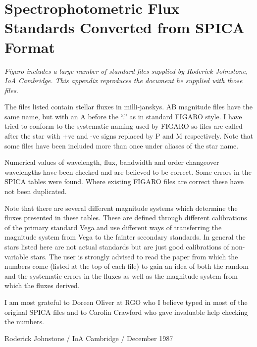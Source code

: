 \section{Spectrophotometric Flux Standards Converted from SPICA Format}

{\it Figaro includes a large number of standard files supplied by
Roderick Johnstone, IoA Cambridge.  This appendix reproduces the document
he supplied with those files.}

The files listed contain stellar fluxes in milli-janskys.
AB magnitude files have the same name, but with an A before the ``.'' as in
standard FIGARO style. I have tried to conform to the systematic naming used
by FIGARO so files are called after the star with +ve and -ve signs replaced
by P and M respectively. Note that some files have been included more than
once under aliases of the star name.

Numerical values of wavelength, flux, bandwidth and order changeover
wavelengths have been checked and are believed to be correct. Some errors
in the SPICA tables were found. Where existing FIGARO files are correct these
have not been duplicated. 

Note that there are several different magnitude systems which determine 
the fluxes presented in these tables. These are defined through different
calibrations of the primary  standard Vega and use different ways of
transferring the magnitude system from Vega to the fainter secondary
standards. In general the stars listed here are not actual standards but are
just good calibrations of non-variable stars. The user is strongly advised to
read the paper from which the numbers come (listed at the top of each file) to
gain an idea of both the random and the systematic errors in the fluxes as
well as the magnitude system from which the fluxes derived. 

I am most grateful to Doreen Oliver at RGO who I believe typed in most of the
original SPICA files and to Carolin Crawford who gave invaluable help checking
the numbers.

Roderick Johnstone / IoA Cambridge / December 1987

